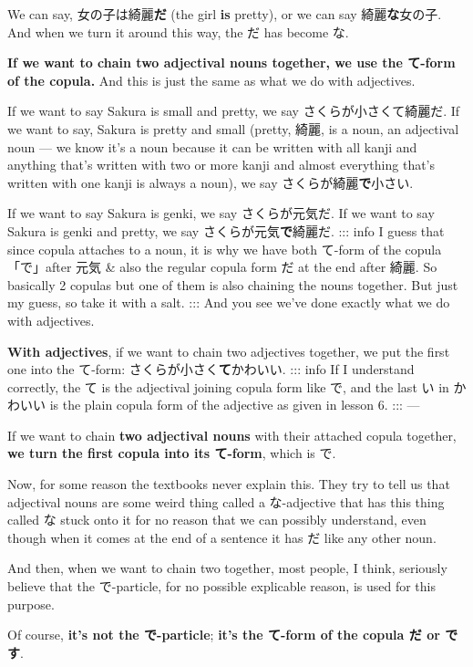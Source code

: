We can say, 女の子は綺麗{\bf だ} (the girl {\bf is} pretty), or we can say 綺麗{\bf な}女の子. And when we turn it around this way, the だ has become な.

{\bf If we want to chain two adjectival nouns together, we use the て-form of the copula.} And this is just the same as what we do with adjectives.

If we want to say Sakura is small and pretty, we say さくらが小さくて綺麗だ. If we want to say, Sakura is pretty and small (pretty, 綺麗, is a noun, an adjectival noun --- we know it's a noun because it can be written with all kanji and anything that's written with two or more kanji and almost everything that's written with one kanji is always a noun), we say さくらが綺麗{\bf で}小さい.

If we want to say Sakura is genki, we say さくらが元気だ. If we want to say Sakura is genki and pretty, we say さくらが元気{\bf で}綺麗だ. ::: info I guess that since copula attaches to a noun, it is why we have both て-form of the copula 「で」after 元気 & also the regular copula form だ at the end after 綺麗. So basically 2 copulas but one of them is also chaining the nouns together. But just my guess, so take it with a salt. ::: And you see we've done exactly what we do with adjectives.

{\bf With adjectives}, if we want to chain two adjectives together, we put the first one into the て-form: さくらが小さく{\bf て}かわいい. ::: info If I understand correctly, the て is the adjectival joining copula form like で, and the last い in かわいい is the plain copula form of the adjective as given in lesson 6. ::: ---

If we want to chain {\bf two adjectival nouns} with their attached copula together, {\bf we turn the first copula into its て-form}, which is で.

Now, for some reason the textbooks never explain this. They try to tell us that adjectival nouns are some weird thing called a な-adjective that has this thing called な stuck onto it for no reason that we can possibly understand, even though when it comes at the end of a sentence it has だ like any other noun.

And then, when we want to chain two together, most people, I think, seriously believe that the で-particle, for no possible explicable reason, is used for this purpose.

Of course, {\bf it's not the で-particle}; {\bf it's the て-form of the copula だ or です}.

